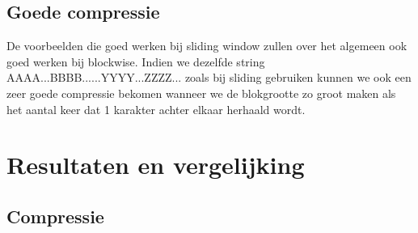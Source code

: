 \documentclass[twoside,twocolumn]{article}
\begin{document}
    \subsection{Goede compressie}
        De voorbeelden die goed werken bij sliding window zullen over het algemeen ook goed werken bij blockwise. Indien we dezelfde string AAAA...BBBB......YYYY...ZZZZ... zoals bij sliding gebruiken kunnen we ook een zeer goede compressie bekomen wanneer we de blokgrootte zo groot maken als het aantal keer dat 1 karakter achter elkaar herhaald wordt.


\section{Resultaten en vergelijking} \label{1}
    \subsection{Compressie} \label{2}
\end{document}
